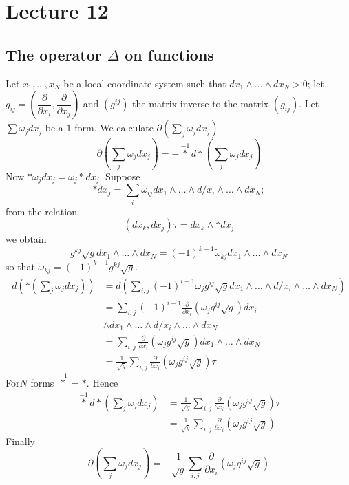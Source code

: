 \chapter{Lecture 12}

\section*{The operator $\Delta$ on functions}\pageoriginale

Let $x_{1},\ldots,x_{N}$ be a local coordinate system such that
$dx_{1}\wedge\ldots\wedge dx_{N}>0$; let
$g_{ij}=\left(\dfrac{\partial}{\partial
  x_{i}},\dfrac{\partial}{\partial x_{j}}\right)$ and $(g^{ij})$ the
matrix inverse to the matrix $(g_{ij})$. Let $\sum \omega_{j}dx_{j}$
be a $1$-form. We calculate
$\partial(\sum\limits_{j}\omega_{j}dx_{j})$
$$
\partial\left(\sum_{j}\omega_{j}dx_{j}\right)=
-\overset{-1}{\ast}d\ast \left(\sum_{j}\omega_{j}dx_{j}\right)  
$$
Now $\ast\omega_{j}dx_{j}=\omega_{j}\ast dx_{j}$. Suppose
$$
\ast dx_{j}=\sum_{i}\widetilde{\omega}_{ij}dx_{1}\wedge\ldots\wedge
d/x_{i}\wedge\ldots\wedge dx_{N};
$$
from the relation
$$
(dx_{k},dx_{j})\tau=dx_{k}\wedge\ast dx_{j}
$$
we obtain
$$
g^{kj}\sqrt{g}dx_{1}\wedge\ldots\wedge
dx_{N}=(-1)^{k-1}\widetilde{\omega}_{kj}dx_{1}\wedge\ldots\wedge
dx_{N}
$$
so that $\widetilde{\omega}_{kj}=(-1)^{k-1}g^{kj}\sqrt{g}$.
\begin{align*}
d\left(\ast \left(\sum_{j}\omega_{j}dx_{j}\right)\right) &=
d \left(\sum_{i,j}(-1)^{i-1}\omega_{j}g^{ij}\sqrt{g}dx_{1}\wedge\ldots\wedge
d/x_{i}\wedge\ldots\wedge dx_{N}\right)\\
&= \sum_{i,j}(-1)^{i-1}\frac{\partial}{\partial
  x_{i}}(\omega_{j}g^{ij}\sqrt{g})dx_{i}\\
&\wedge
dx_{1}\wedge\ldots\wedge d/x_{i}\wedge\ldots\wedge dx_{N}\\
&= \sum_{i,j}\frac{\partial}{\partial
  x_{i}}(\omega_{j}g^{ij}\sqrt{g})dx_{1}\wedge\ldots\wedge dx_{N}\\
&= \frac{1}{\sqrt{g}}\sum_{i,j}\frac{\partial}{\partial
  x_{i}}(\omega_{j}g^{ij}\sqrt{g})\tau 
\end{align*}
For\pageoriginale $N$ forms $\overset{-1}{\ast}=\ast$. Hence
\begin{align*}
\overset{-1}{\ast}d\ast \left(\sum_{j}\omega_{j}dx_{j}\right) &=
\frac{1}{\sqrt{g}}\sum_{i,j}\frac{\partial}{\partial
  x_{i}}(\omega_{j}g^{ij}\sqrt{g})\tau\\
&= \frac{1}{\sqrt{g}}\sum_{i,j}\frac{\partial}{\partial
  x_{i}}(\omega_{j}g^{ij}\sqrt{g}) 
\end{align*}
Finally
$$
\partial
\left(\sum_{j}\omega_{j}dx_{j}\right)=-\frac{1}{\sqrt{g}}\sum_{i,j}\frac{\partial}{\partial
  x_{i}}(\omega_{j}g^{ij}\sqrt{g}) 
$$

